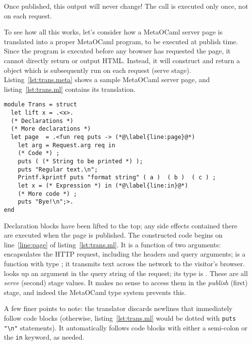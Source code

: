 \documentclass[preprint]{acm_proc_article-sp}
\def\MOC{MetaOCaml}
\newcommand{\mylst}[3]{%
  }
\newcommand{\lstfloat}{\mylst{float=htb,}}
\begin{document}
Once published, this output will never change!  The 
call is executed only once, not on each request.

To see how all this works, let's consider how a \MOC{} server
page is translated into a proper \MOC{} program, to be executed
at publish time.  Since the program is executed before any
browser has requested the page, it cannot directly return or
output HTML.  Instead, it will construct and return a 
object which is subsequently run on each request (serve stage).
Listing~\ref{lst:trans.meta} shows a sample \MOC{} server page,
and listing~\ref{lst:trans.ml} contains its translation.

\lstfloat{trans.meta}{This file demonstrates the various
  kinds of code blocks.}%
\begin{lstlisting}[language={[Objective]Caml},
  label={lst:trans.ml}, float=htb, 
  caption={\texttt{trans.ml}.  This is the translation of the
    page in listing~\ref{lst:trans.meta}.  Declarations have
    been lifted, and everything else appears within
    \lstinline{.<brackets>.}}]
module Trans = struct
  let lift x = .<x>.
  (* Declarations *)  
  (* More declarations *) 
  let page  = .<fun req puts -> (*@\label{line:page}@*)
    let arg = Request.arg req in 
    (* Code *) ;
    puts ( (* String to be printed *) );
    puts "Regular text.\n";
    Printf.kprintf puts "format string" ( a )  ( b )  ( c ) ;
    let x = (* Expression *) in (*@\label{line:in}@*)
    (* More code *) ;
    puts "Bye!\n";>.
end
\end{lstlisting}

Declaration blocks have been lifted to the top; any side effects
contained there are executed when the page is published.  The
constructed code begins on line~\ref{line:page} of
listing~\ref{lst:trans.ml}.  It is a function of two arguments:
 encapsulates the HTTP request, including the headers
and query arguments;  is a function with type
; it transmits text across the network to the
visitor's browser.   looks up an
argument in the query string of the request; its type is
.  These are all \emph{serve} (second)
stage values.  It makes no sense to access them in the
\emph{publish} (first) stage, and indeed the \MOC{} type system
prevents this.

A few finer points to note: the translator discards newlines that
immediately follow code blocks (otherwise,
listing~\ref{lst:trans.ml} would be dotted with %
\lstinline{puts "\n"} statements).  It automatically follows
code blocks with either a semi-colon or the \lstinline{in}
keyword, as needed.
\end{document}
